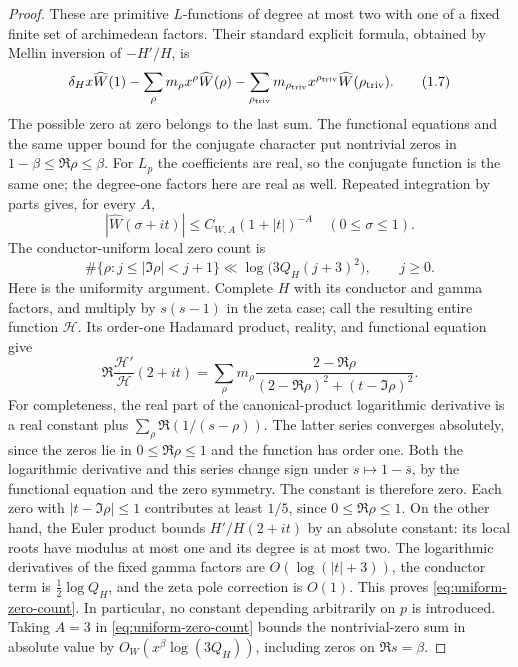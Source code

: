 \documentclass[11pt]{article}
\begin{document}
\begin{proof}
These are primitive $L$-functions of degree at most two with one of a
fixed finite set of archimedean factors. Their standard explicit
formula, obtained by Mellin inversion of $-H'/H$, is
\[
 \delta_H x\widehat W(1)
 -\sum_{\rho}m_\rho x^\rho\widehat W(\rho)
 -\sum_{\rho_{\rm triv}}m_{\rho_{\rm triv}}
             x^{\rho_{\rm triv}}\widehat W(\rho_{\rm triv}).
                                                                    \tag{1.7}\label{eq:uniform-zero-expansion}
\]
The possible zero at zero belongs to the last sum. The functional
equations and the same upper bound for the conjugate character put
nontrivial zeros in $1-\beta\le\Re\rho\le\beta$.
For $L_p$ the coefficients are real, so the conjugate function is the
same one; the degree-one factors here are real as well.
Repeated integration by parts gives, for every $A$,
\[
 |\widehat W(\sigma+it)|\le C_{W,A}(1+|t|)^{-A}
       \quad(0\le\sigma\le1).
 \]
The conductor-uniform local zero count is
\[
 \#\{\rho:j\le|\Im\rho|<j+1\}
 \ll \log\bigl(3Q_H(j+3)^2\bigr),\qquad j\ge0.                     \tag{1.8}\label{eq:uniform-zero-count}
\]
Here is the uniformity argument. Complete $H$ with its conductor
and gamma factors, and multiply by $s(s-1)$ in the zeta case;
call the resulting entire function $\mathcal H$. Its order-one
Hadamard product, reality, and functional equation give
\[
 \Re\frac{\mathcal H'}{\mathcal H}(2+it)
 =\sum_\rho m_\rho
   \frac{2-\Re\rho}{(2-\Re\rho)^2+(t-\Im\rho)^2}.
\]
For completeness, the real part of the canonical-product
logarithmic derivative is a real constant plus
$\sum_\rho\Re(1/(s-\rho))$. The latter series converges absolutely,
since the zeros lie in $0\le\Re\rho\le1$ and the function has order
one. Both the logarithmic derivative and this series change sign
under $s\mapsto1-\overline s$, by the functional equation and the
zero symmetry. The constant is therefore zero.
Each zero with $|t-\Im\rho|\le1$ contributes
at least $1/5$, since $0\le\Re\rho\le1$.
On the other hand, the Euler product bounds $H'/H(2+it)$ by an
absolute constant: its local roots have modulus at most one
and its degree is at most two. The logarithmic derivatives
of the fixed gamma factors are $O(\log(|t|+3))$, the conductor
term is $\tfrac12\log Q_H$, and the zeta pole correction is
$O(1)$. This proves \eqref{eq:uniform-zero-count}. In particular, no constant depending
arbitrarily on $p$ is introduced. Taking $A=3$
in \eqref{eq:uniform-zero-count} bounds the nontrivial-zero sum in absolute value by
$O_W(x^\beta\log(3Q_H))$, including zeros on $\Re s=\beta$.

\end{proof}
\end{document}
